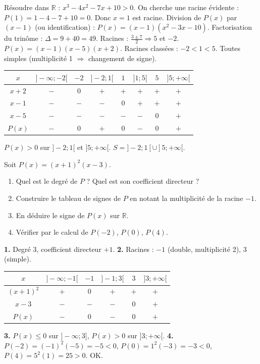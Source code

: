 \documentclass[11pt]{article}
\begin{document}
\begin{exoresolu}
Résoudre dans $\mathbb{R}$ : $x^3 - 4x^2 - 7x + 10 > 0$.
\tcblower
On cherche une racine évidente : $P(1) = 1 - 4 - 7 + 10 = 0$. Donc $x=1$ est racine.
Division de $P(x)$ par $(x-1)$ (ou identification) :
$P(x) = (x-1)(x^2 - 3x - 10)$.
Factorisation du trinôme : $\Delta = 9 + 40 = 49$. Racines : $\frac{3 \pm 7}{2} \Rightarrow 5$ et $-2$.
$P(x) = (x-1)(x-5)(x+2)$.
Racines classées : $-2 < 1 < 5$. Toutes simples (multiplicité 1 $\Rightarrow$ changement de signe).
\begin{center}
\begin{tabular}{|c|ccccccc|}\hline
$x$ & $]-\infty; -2[$ & $-2$ & $]-2; 1[$ & $1$ & $]1; 5[$ & $5$ & $]5; +\infty[$ \\ \hline
$x+2$ & $-$ & $0$ & $+$ & $+$ & $+$ & $+$ & $+$ \\
$x-1$ & $-$ & $-$ & $-$ & $0$ & $+$ & $+$ & $+$ \\
$x-5$ & $-$ & $-$ & $-$ & $-$ & $-$ & $0$ & $+$ \\ \hline
$P(x)$ & $-$ & $0$ & $+$ & $0$ & $-$ & $0$ & $+$ \\ \hline
\end{tabular}
\end{center}
$P(x) > 0$ sur $]-2; 1[$ et $]5; +\infty[$.
$S = ]-2; 1[ \cup ]5; +\infty[$.
\end{exoresolu}

\begin{experience}
Soit $P(x) = (x+1)^2(x-3)$.
\begin{enumerate}
  \item Quel est le degré de $P$ ? Quel est son coefficient directeur ?
  \item Construire le tableau de signes de $P$ en notant la multiplicité de la racine $-1$.
  \item En déduire le signe de $P(x)$ sur $\mathbb{R}$.
  \item Vérifier par le calcul de $P(-2)$, $P(0)$, $P(4)$.
\end{enumerate}
\tcblower
\textbf{1.} Degré 3, coefficient directeur $+1$.
\textbf{2.} Racines : $-1$ (double, multiplicité 2), $3$ (simple).
\begin{center}
\begin{tabular}{|c|ccccc|}\hline
$x$ & $]-\infty; -1[$ & $-1$ & $]-1; 3[$ & $3$ & $]3; +\infty[$ \\ \hline
$(x+1)^2$ & $+$ & $0$ & $+$ & $+$ & $+$ \\
$x-3$ & $-$ & $-$ & $-$ & $0$ & $+$ \\ \hline
$P(x)$ & $-$ & $0$ & $-$ & $0$ & $+$ \\ \hline
\end{tabular}
\end{center}
\textbf{3.} $P(x) \le 0$ sur $]-\infty; 3]$, $P(x) > 0$ sur $]3; +\infty[$.
\textbf{4.} $P(-2)=(-1)^2(-5)=-5<0$, $P(0)=1^2(-3)=-3<0$, $P(4)=5^2(1)=25>0$. OK.
\end{experience}
\end{document}
